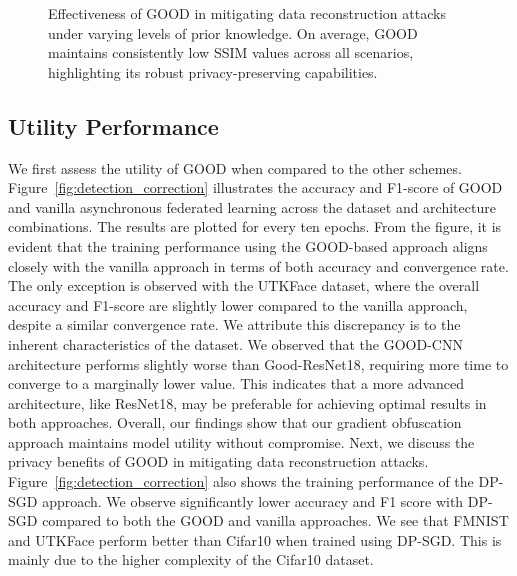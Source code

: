 \begin{figure*}[htb]
    \centering %
\hspace{-0.5in}
\hfill
{}
\vspace{-0.15in}
\caption{Effectiveness of GOOD in mitigating data reconstruction attacks under varying levels of prior knowledge. On average, GOOD maintains consistently low SSIM values across all scenarios, highlighting its robust privacy-preserving capabilities.}
\label{fig:Reconstruction_different_prior}
\vspace{-0.1in}
\end{figure*}






\subsection{Utility Performance}
We first assess the utility of GOOD when compared to the other schemes. Figure~\ref{fig:detection_correction} illustrates the accuracy and F1-score of GOOD and vanilla asynchronous federated learning across the dataset and architecture combinations. The results are plotted for every ten epochs. 
From the figure, it is evident that the training performance using the GOOD-based approach aligns closely with the vanilla approach in terms of both accuracy and convergence rate. The only exception is observed with the UTKFace dataset, where the overall accuracy and F1-score are slightly lower compared to the vanilla approach, despite a similar convergence rate. We attribute this discrepancy is to the inherent characteristics of the dataset. 
We observed that the GOOD-CNN architecture performs slightly worse than Good-ResNet18, requiring more time to converge to a marginally lower value. This indicates that a more advanced architecture, like ResNet18, may be preferable for achieving optimal results in both approaches. Overall, our findings show that our gradient obfuscation approach maintains model utility without compromise. Next, we discuss the privacy benefits of GOOD in mitigating data reconstruction attacks.
Figure~\ref{fig:detection_correction} also shows the training performance of the DP-SGD approach. We observe significantly lower accuracy and F1 score with DP-SGD compared to both the GOOD and vanilla approaches. We see that FMNIST and UTKFace perform better than Cifar10 when trained using DP-SGD. This is mainly due to the higher complexity of the Cifar10 dataset.



